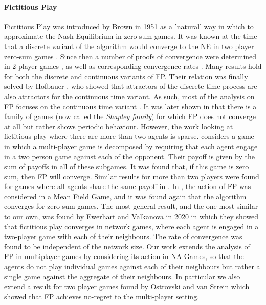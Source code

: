 \documentclass{article}
\theoremstyle{definition}
\begin{document}
\paragraph{Fictitious Play}

Fictitious Play was introduced by Brown in 1951 \cite{BrownPublished, BrownUnpublished} as a
'natural' way in which to approximate the Nash Equilibrium in zero sum games. It was known at the
time that a discrete variant of the algorithm would converge to the NE in two player zero-sum games
\cite{Robinson}. Since then a number of proofs of convergence were determined in 2 player games
\cite{Miyasawa, Polak, Berger, Monderer and Sela, Monderer and Shapley}, as well as corresponding
convergence rates \cite{Harris, Shapiro}. Many results hold for both the discrete and continuous
variants of FP. Their relation was finally solved by Hofbauer \cite{Hofbauer}, who showed that
attractors of the discrete time process are also attractors for the continuous time variant. As
such, most of the analysis on FP focuses on the continuous time variant \cite{Ostrovski}. It was
later shown in \cite{Shapley} that there is a family of games (now called the \emph{Shapley family})
for which FP does not converge at all but rather shows periodic behaviour. However, the work looking at fictitious play
where there are more than two agents is sparse. \cite{Sela} considers a game in which a multi-player
game is decomposed by requiring that each agent engage in a two person game against each of the
opponent. Their payoff is given by the sum of payoffs in all of these subgames. It was found that,
if this game is zero sum, then FP will converge. Similar results for more than two players were
found for games where all agents share the same payoff in \cite{MondererShapley1994}. In \cite{FPMFG}, the action
of FP was considered in a Mean Field Game, and it was found again that the algorithm converges for
zero sum games. The most general result, and the one most similar to our own, was found by Ewerhart
and Valkanova in 2020 \cite{Ewerhart} in which they showed that fictitious play converges in network
games, where each agent is engaged in a two-player game with each of their neighbours. The rate of
convergence was found to be independent of the network size.  Our work extends the analysis of FP in
multiplayer games by considering its action in NA Games, so that the agents do not play individual
games against each of their neighbours but rather a single game against the aggregate of their
neighbours. In particular we also extend a result for two player games found by Ostrovski and van
Strein \cite{Payoff Performance} which showed that FP achieves no-regret to the multi-player
setting.
\end{document}
